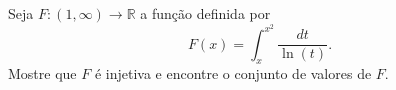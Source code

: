 Seja \(F\colon(1,\infty) \rightarrow \mathbb{R}\) a função definida por
\[F(x)=\int_{x}^{x^{2}} \frac{dt}{\ln(t)}.\] Mostre que \(F\) é injetiva e encontre o conjunto de valores de \(F\).
